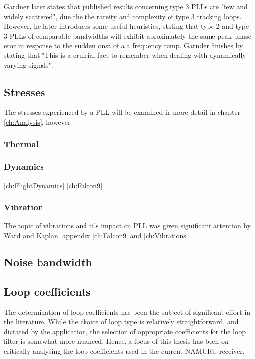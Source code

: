     Gardner later states that published results concerning type 3 PLLs are "few and widely scattered", due the the rareity and complexity of type 3 tracking loops. However, he later introduces some useful heuristics, stating that type 2 and type 3 PLLs of comparable bandwidths will exhibit aproximately the same peak phase eror in response to the sudden onst of a a frequency ramp\cite{Gardner}.  Garnder finishes by stating that "This is a cruicial fact to remember when dealing with dynamically varying signals".

    
    
	\subsection{Stresses}
	    The stresses experienced by a PLL will be examined in more detail in chapter \ref{ch:Analysis}, however 
	    
		\subsubsection{Thermal}


		\subsubsection{Dynamics}
		\ref{ch:FlightDynamics}
		\ref{ch:Falcon9}


		\subsubsection{Vibration}
		The topic of vibrations and it's impact on PLL was given significant attention by Ward and Kaplan. 
		appendix \ref{ch:Falcon9} and \ref{ch:Vibrations}
		
    \subsection{Noise bandwidth}
    
    
	\subsection{Loop coefficients}
	The determination of loop coefficients has been the subject of significant effort in the literature.  While the choice of loop type is relatively straightforward, and dictated by the application, the selection of appropriate coefficients for the loop filter is somewhat more nuanced. Hence, a focus of this thesis has been on critically analysing the loop coefficients used in the current \ac{NAMURU} receiver. 
	
